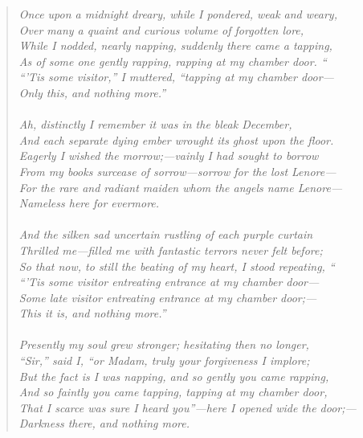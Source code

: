 \documentclass[12pt, a4paper]{article}
\begin{document}
\begin{quote}
\linespread{1.1} %
\textit{
Once upon a midnight dreary, while I pondered, weak and weary, \\
Over many a quaint and curious volume of forgotten lore, \\
While I nodded, nearly napping, suddenly there came a tapping, \\
As of some one gently rapping, rapping at my chamber door. “ \\
“'Tis some visitor,” I muttered, “tapping at my chamber door— \\
Only this, and nothing more.” \\
\\
Ah, distinctly I remember it was in the bleak December, \\
And each separate dying ember wrought its ghost upon the floor. \\
Eagerly I wished the morrow;—vainly I had sought to borrow \\
From my books surcease of sorrow—sorrow for the lost Lenore— \\
For the rare and radiant maiden whom the angels name Lenore— \\
Nameless here for evermore. \\
\\
And the silken sad uncertain rustling of each purple curtain \\
Thrilled me—filled me with fantastic terrors never felt before; \\
So that now, to still the beating of my heart, I stood repeating, “ \\
“'Tis some visitor entreating entrance at my chamber door— \\
Some late visitor entreating entrance at my chamber door;— \\
This it is, and nothing more.” \\
\\
Presently my soul grew stronger; hesitating then no longer, \\
“Sir,” said I, “or Madam, truly your forgiveness I implore; \\
But the fact is I was napping, and so gently you came rapping, \\
And so faintly you came tapping, tapping at my chamber door, \\
That I scarce was sure I heard you”—here I opened wide the door;— \\
Darkness there, and nothing more. \\
}
\end{quote}
\end{document}
